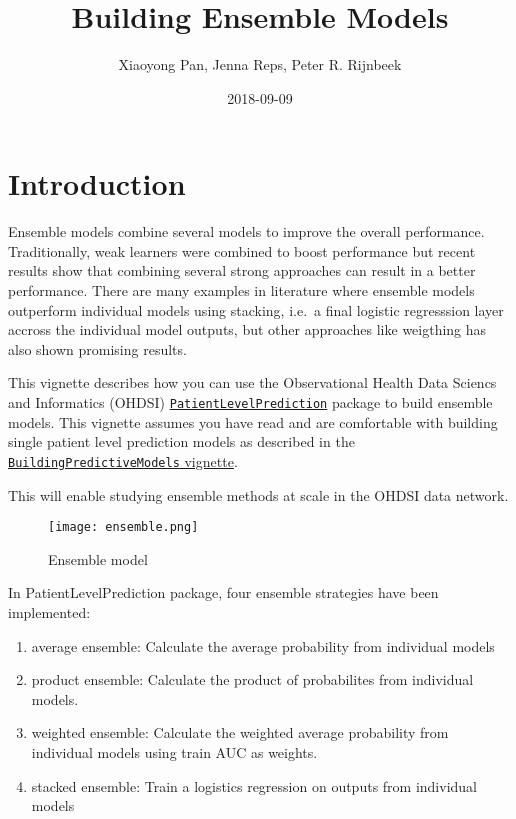 \documentclass[]{article}
\title{Building Ensemble Models}
\author{Xiaoyong Pan, Jenna Reps, Peter R. Rijnbeek}
\date{2018-09-09}
\providecommand{\tightlist}{%
  \setlength{\itemsep}{0pt}\setlength{\parskip}{0pt}}
\begin{document}
\maketitle

{
\setcounter{tocdepth}{2}
\tableofcontents
}
\section{Introduction}\label{introduction}

Ensemble models combine several models to improve the overall
performance. Traditionally, weak learners were combined to boost
performance but recent results show that combining several strong
approaches can result in a better performance. There are many examples
in literature where ensemble models outperform individual models using
stacking, i.e.~a final logistic regresssion layer accross the individual
model outputs, but other approaches like weigthing has also shown
promising results.

This vignette describes how you can use the Observational Health Data
Sciencs and Informatics (OHDSI)
\href{http://github.com/OHDSI/PatientLevelPrediction}{\texttt{PatientLevelPrediction}}
package to build ensemble models. This vignette assumes you have read
and are comfortable with building single patient level prediction models
as described in the
\href{https://github.com/OHDSI/PatientLevelPrediction/blob/master/inst/doc/BuildingPredictiveModels.pdf}{\texttt{BuildingPredictiveModels}
vignette}.

This will enable studying ensemble methods at scale in the OHDSI data
network.

\begin{figure}
\centering
\texttt{[image: ensemble.png]}
\caption{Ensemble model}
\end{figure}

In PatientLevelPrediction package, four ensemble strategies have been
implemented:

\begin{enumerate}
\def\labelenumi{\arabic{enumi}.}
\tightlist
\item
  average ensemble: Calculate the average probability from individual
  models
\item
  product ensemble: Calculate the product of probabilites from
  individual models.
\item
  weighted ensemble: Calculate the weighted average probability from
  individual models using train AUC as weights.
\item
  stacked ensemble: Train a logistics regression on outputs from
  individual models
\end{enumerate}
\end{document}
